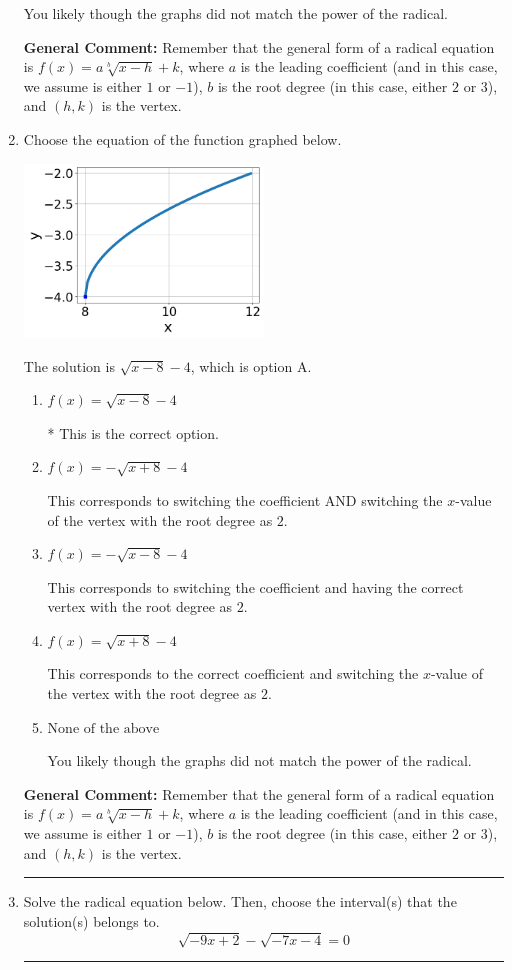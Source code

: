 \documentclass{extbook}[14pt]
\newcommand{\litem}[1]{\item #1

\rule{\textwidth}{0.4pt}}
\begin{document}
\begin{enumerate}
{\begin{enumerate}[label=\Alph*.]
You likely though the graphs did not match the power of the radical.
\end{enumerate}

\textbf{General Comment:} Remember that the general form of a radical equation is $ f(x) = a \sqrt[b]{x - h} + k$, where $a$ is the leading coefficient (and in this case, we assume is either $1$ or $-1$), $b$ is the root degree (in this case, either $2$ or $3$), and $(h, k)$ is the vertex.
}
\litem{
Choose the equation of the function graphed below.

\begin{center}
    \includegraphics[width=0.5\textwidth]{../Figures/radicalGraphToEquationC.png}
\end{center}




The solution is \( \sqrt{x - 8} - 4 \), which is option A.\begin{enumerate}[label=\Alph*.]
\item \( f(x) = \sqrt{x - 8} - 4 \)

* This is the correct option.
\item \( f(x) = - \sqrt{x + 8} - 4 \)

This corresponds to switching the coefficient AND switching the $x$-value of the vertex with the root degree as $2$.
\item \( f(x) = - \sqrt{x - 8} - 4 \)

This corresponds to switching the coefficient and having the correct vertex with the root degree as $2$.
\item \( f(x) = \sqrt{x + 8} - 4 \)

This corresponds to the correct coefficient and switching the $x$-value of the vertex with the root degree as $2$.
\item \( \text{None of the above} \)

You likely though the graphs did not match the power of the radical.
\end{enumerate}

\textbf{General Comment:} Remember that the general form of a radical equation is $ f(x) = a \sqrt[b]{x - h} + k$, where $a$ is the leading coefficient (and in this case, we assume is either $1$ or $-1$), $b$ is the root degree (in this case, either $2$ or $3$), and $(h, k)$ is the vertex.
}
\litem{
Solve the radical equation below. Then, choose the interval(s) that the solution(s) belongs to.
\[ \sqrt{-9 x + 2} - \sqrt{-7 x - 4} = 0 \]

}
\end{enumerate}
\end{document}
